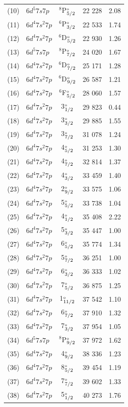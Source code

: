 \documentclass[10pt,a4paper, twoside]{report}
\begin{document}
\begin{table}[t]
\begin{tabular}{cl@{\hspace{0.5cm}}c@{\hspace{0.5cm}}r@{\hspace{0.5cm}}r}
(10) &   $6d^5 7s 7p$  &  $^8$P$_{5/2}^{\rm_o}$    & 22 228 & 2.08 \\  
(11) &   $6d^4 7s^2 7p $   &  $^6$P$_{3/2}^{\rm_o}$    & 22 533 & 1.74 \\  
(12) &   $6d^4 7s^2 7p $   &  $^6$D$_{5/2}^{\rm_o}$    & 22 930 & 1.26 \\  
 (13) &   $6d^5 7s 7p$  &  $^8$P$_{7/2}^{\rm_o}$    & 24 020 & 1.67 \\ 
(14)   &   $6d^4 7s^2 7p $   &  $^6$D$_{7/2}^{\rm_o}$    & 25 171 & 1.28 \\  
(15)  &   $6d^4 7s^2 7p $   &  $^6$D$_{9/2}^{\rm_o}$    & 26 587 & 1.21 \\  
 (16) &   $6d^4 7s^2 7p $  &  $^6$F$_{5/2}^{\rm_o}$    & 28 060 & 1.57 \\  
 (17) &  $6d^4 7s^2 7p $  & 3$_{1/2}^{\rm_o}$  & 29 823 & 0.44 \\ 
(18) &   $6d^4 7s^2 7p $ &  3$_{3/2}^{\rm_o}$  & 29 885 & 1.55 \\
(19) &  $6d^4 7s^2 7p $  & 3$_{7/2}^{\rm_o}$  & 31 078 & 1.24 \\ 
(20) &   $6d^4 7s^2 7p $ & 4$_{5/2}^{\rm_o}$  & 31 253 & 1.30 \\ 
(21) &   $6d^4 7s^2 7p $  & 4$_{7/2}^{\rm_o}$  & 32 814 & 1.37 \\ 
(22) &  $6d^4 7s^2 7p $  & 4$_{3/2}^{\rm_o}$  & 33 459 & 1.40 \\
(23) & $6d^4 7s^2 7p $  & 2$_{9/2}^{\rm_o}$  & 33 575 & 1.06 \\
(24) & $6d^4 7s^2 7p $  & 5$_{5/2}^{\rm_o}$     & 33 738 & 1.04 \\
(25) & $6d^4 7s^2 7p $  &  4$_{1/2}^{\rm_o}$  & 35 408 & 2.22 \\
(26) & $6d^4 7s^2 7p $  & 5$_{3/2}^{\rm_o}$   & 35 447 & 1.00 \\
(27) & $6d^4 7s^2 7p $  & 6$_{5/2}^{\rm_o}$  & 35 774 & 1.34 \\
(28) & $6d^4 7s^2 7p $  & 5$_{7/2}^{\rm_o}$   & 36 251 & 1.00 \\
(29) & $6d^4 7s^2 7p $  & 6$_{3/2}^{\rm_o}$    & 36 333 & 1.02 \\
(30) & $6d^4 7s^2 7p $  & 7$_{5/2}^{\rm_o}$    & 36 875 & 1.25 \\
(31) & $6d^4 7s^2 7p $  &  1$_{11/2}^{\rm_o}$    & 37 542 & 1.10 \\
(32) & $6d^4 7s^2 7p $  & 6$_{7/2}^{\rm_o}$  & 37 910 & 1.32 \\
(33)  & $6d^4 7s^2 7p $  & 7$_{3/2}^{\rm_o}$     & 37 954 & 1.05 \\
(34)  & $6d^5 7s 7p $  &  $^8$P$_{9/2}^{\rm_o}$    & 37 972 & 1.62 \\
(35) &  $6d^4 7s^2 7p $  & 4$_{9/2}^{\rm_o}$  & 38 336 & 1.23 \\  
(36) &  $6d^4 7s^2 7p $  & 8$_{5/2}^{\rm_o}$  & 39 454 & 1.19 \\
(37) &  $6d^4 7s^2 7p $  & 7$_{7/2}^{\rm_o}$  & 39 602 & 1.33 \\
(38) & $6d^4 7s^2 7p $  & 5$_{1/2}^{\rm_o}$  & 40 273 & 1.76 \\


\end{tabular}
\end{table}
\end{document}

